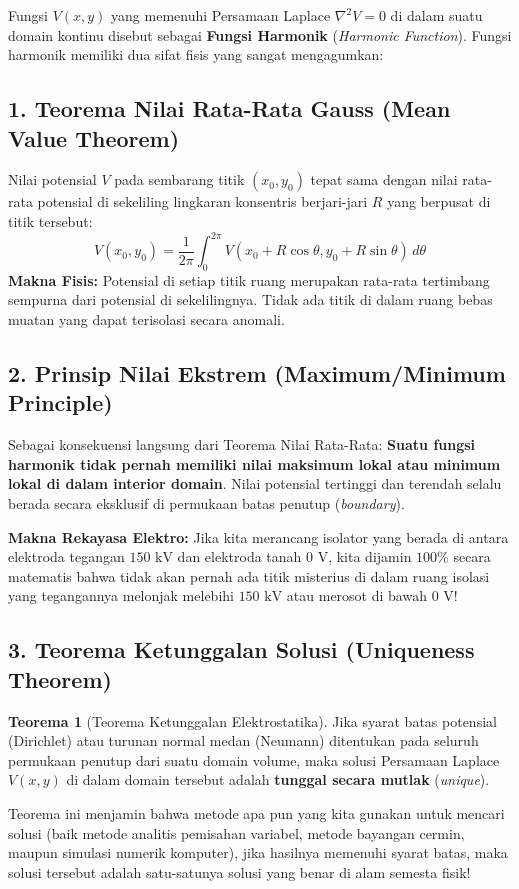 \documentclass[11pt,a4paper]{article}
\theoremstyle{definition}
\newtheorem{theorem}{Teorema}[section]
\begin{document}
Fungsi $V(x, y)$ yang memenuhi Persamaan Laplace $\nabla^2 V = 0$ di dalam suatu domain kontinu disebut sebagai \textbf{Fungsi Harmonik} (\textit{Harmonic Function}). Fungsi harmonik memiliki dua sifat fisis yang sangat mengagumkan:

\subsection{1. Teorema Nilai Rata-Rata Gauss (Mean Value Theorem)}
Nilai potensial $V$ pada sembarang titik $(x_0, y_0)$ tepat sama dengan nilai rata-rata potensial di sekeliling lingkaran konsentris berjari-jari $R$ yang berpusat di titik tersebut:
\begin{equation}
    V(x_0, y_0) = \frac{1}{2\pi} \int_{0}^{2\pi} V(x_0 + R\cos\theta, y_0 + R\sin\theta) \, d\theta
    \label{eq:mean_value_theorem}
\end{equation}
\textbf{Makna Fisis:} Potensial di setiap titik ruang merupakan rata-rata tertimbang sempurna dari potensial di sekelilingnya. Tidak ada titik di dalam ruang bebas muatan yang dapat terisolasi secara anomali.

\subsection{2. Prinsip Nilai Ekstrem (Maximum/Minimum Principle)}
Sebagai konsekuensi langsung dari Teorema Nilai Rata-Rata: \textbf{Suatu fungsi harmonik tidak pernah memiliki nilai maksimum lokal atau minimum lokal di dalam interior domain}. Nilai potensial tertinggi dan terendah selalu berada secara eksklusif di permukaan batas penutup (\textit{boundary}).

\textbf{Makna Rekayasa Elektro:} Jika kita merancang isolator yang berada di antara elektroda tegangan $150\text{ kV}$ dan elektroda tanah $0\text{ V}$, kita dijamin $100\%$ secara matematis bahwa tidak akan pernah ada titik misterius di dalam ruang isolasi yang tegangannya melonjak melebihi $150\text{ kV}$ atau merosot di bawah $0\text{ V}$!

\subsection{3. Teorema Ketunggalan Solusi (Uniqueness Theorem)}
\begin{theorem}[Teorema Ketunggalan Elektrostatika]
Jika syarat batas potensial (Dirichlet) atau turunan normal medan (Neumann) ditentukan pada seluruh permukaan penutup dari suatu domain volume, maka solusi Persamaan Laplace $V(x, y)$ di dalam domain tersebut adalah \textbf{tunggal secara mutlak} (\textit{unique}).
\end{theorem}
Teorema ini menjamin bahwa metode apa pun yang kita gunakan untuk mencari solusi (baik metode analitis pemisahan variabel, metode bayangan cermin, maupun simulasi numerik komputer), jika hasilnya memenuhi syarat batas, maka solusi tersebut adalah satu-satunya solusi yang benar di alam semesta fisik!
\end{document}
